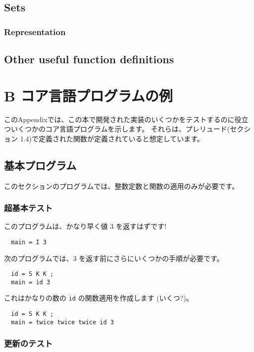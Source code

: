 \documentclass{jarticle}
\begin{document}
\subsection{Sets}
\subsubsection{Representation}
\newpage

\subsection{Other useful function definitions}
\newpage

\section{B コア言語プログラムの例}

このAppendixでは、この本で開発された実装のいくつかをテストするのに役立ついくつかのコア言語プログラムを示します。
それらは、プレリュード(セクション 1.4)で定義された関数が定義されていると想定しています。

\subsection{基本プログラム}

このセクションのプログラムでは、整数定数と関数の適用のみが必要です。

\subsubsection{超基本テスト}

このプログラムは、かなり早く値 3 を返すはずです!

\begin{verbatim}
  main = I 3
\end{verbatim}

次のプログラムでは、3 を返す前にさらにいくつかの手順が必要です。

\begin{verbatim}
  id = S K K ;
  main = id 3
\end{verbatim}

これはかなりの数の \texttt{id} の関数適用を作成します (いくつ?)。

\begin{verbatim}
  id = S K K ;
  main = twice twice twice id 3
\end{verbatim}

\subsubsection{更新のテスト}
\end{document}
